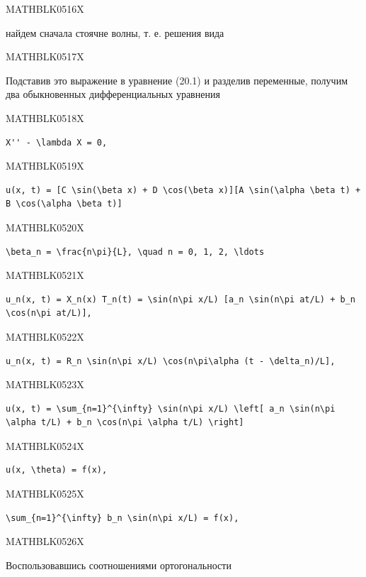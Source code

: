 \documentclass[
  ukrainian,
]{article}
\begin{document}
MATHBLK0516X

найдем сначала стоячне волны, т. е. решения вида

MATHBLK0517X

Подставив это выражение в уравнение (20.1) и разделив переменные,
получим два обыкновенных дифференциальных уравнения

MATHBLK0518X

\begin{verbatim}
X'' - \lambda X = 0,
\end{verbatim}

MATHBLK0519X

\begin{verbatim}
u(x, t) = [C \sin(\beta x) + D \cos(\beta x)][A \sin(\alpha \beta t) + B \cos(\alpha \beta t)]
\end{verbatim}

MATHBLK0520X

\begin{verbatim}
\beta_n = \frac{n\pi}{L}, \quad n = 0, 1, 2, \ldots
\end{verbatim}

MATHBLK0521X

\begin{verbatim}
u_n(x, t) = X_n(x) T_n(t) = \sin(n\pi x/L) [a_n \sin(n\pi at/L) + b_n \cos(n\pi at/L)],
\end{verbatim}

MATHBLK0522X

\begin{verbatim}
u_n(x, t) = R_n \sin(n\pi x/L) \cos(n\pi\alpha (t - \delta_n)/L],
\end{verbatim}

MATHBLK0523X

\begin{verbatim}
u(x, t) = \sum_{n=1}^{\infty} \sin(n\pi x/L) \left[ a_n \sin(n\pi \alpha t/L) + b_n \cos(n\pi \alpha t/L) \right]
\end{verbatim}

MATHBLK0524X

\begin{verbatim}
u(x, \theta) = f(x),
\end{verbatim}

MATHBLK0525X

\begin{verbatim}
\sum_{n=1}^{\infty} b_n \sin(n\pi x/L) = f(x),
\end{verbatim}

MATHBLK0526X

Воспользовавшись соотношениями ортогональности
\end{document}
